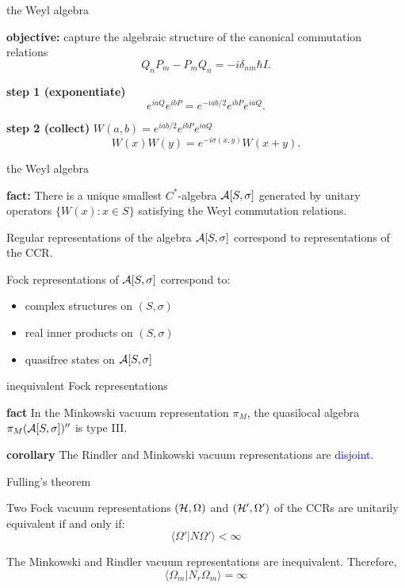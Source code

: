 \documentclass[8pt]{beamer}
\begin{document}
\begin{frame}{the Weyl algebra}

  \textbf{objective:} capture the algebraic structure of the canonical
  commutation relations
$$ Q_nP_m - P_mQ_n = -i\delta _{nm}\hbar I .$$

\bigskip \textbf{step 1 (exponentiate)}
$$ e^{iaQ}e^{ibP} = e^{-iab/2}e^{ibP}e^{iaQ} .$$

\bigskip \textbf{step 2 (collect)} $W(a,b)=e^{iab/2}e^{ibP}e^{iaQ}$
$$ W(x)W(y) = e^{-i\sigma (x,y)}W(x+y). $$

\end{frame}
\begin{frame}{the Weyl algebra}

  \textbf{fact:} There is a unique smallest $C^*$-algebra $\mathcal A
  [S,\sigma ]$ generated by unitary operators $\{ W(x):x\in S \}$
  satisfying the Weyl commutation relations.

  \bigskip Regular representations of the algebra $\mathcal A [S,\sigma ]$
  correspond to representations of the CCR.

\bigskip Fock representations of $\mathcal A [S,\sigma ]$ correspond to:
\begin{itemize}
\item complex structures on $(S,\sigma )$
\item real inner products on $(S,\sigma )$
\item quasifree states on $\mathcal A [S,\sigma ]$
\end{itemize}

\end{frame}

\begin{frame}{inequivalent Fock representations}

  \textbf{fact} In the Minkowski vacuum representation $\pi _M$, the
  quasilocal algebra $\pi _M(\mathcal A [S,\sigma ])''$ is type III.

  \bigskip \textbf{corollary} The Rindler and Minkowski vacuum
  representations are \textcolor{blue}{disjoint}.



\end{frame}


\begin{frame}{Fulling's theorem} 

  Two Fock vacuum representations $(\mathcal H,\Omega )$ and $(\mathcal H',\Omega
  ')$ of the CCRs are unitarily equivalent if and only if:
\[ \langle \Omega ' |N\Omega '\rangle <\infty \] 

\vspace{1em} The Minkowski and Rindler vacuum representations are
inequivalent.  Therefore, \[ \langle \Omega _{m}| N_{r}\Omega
_{m}\rangle = \infty \]

\end{frame}
\end{document}
